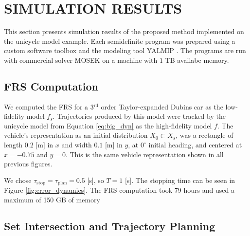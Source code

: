 \section{SIMULATION RESULTS}
\label{sec:examples}
This section presents simulation results of the proposed method implemented on the unicycle model example.
Each semidefinite program was prepared using a custom software toolbox and the modeling tool YALMIP \cite{lofberg2004yalmip}.
The programs are run with commercial solver MOSEK on a machine with $1$ TB availabe memory. 

\subsection{FRS Computation}
We computed the FRS for a 3$^\text{rd}$ order Taylor-expanded Dubins car as the low-fidelity model $f_s$.
Trajectories produced by this model were tracked by the unicycle model from Equation \eqref{eq:big_dyn} as the high-fidelity model $f$.
The vehicle's representation as an initial distribution $X_0 \subset X_s$, was a rectangle of length $0.2$ [m] in $x$ and width $0.1$ [m] in $y$, at $0^\circ$ initial heading, and centered at $x=-0.75$ and $y=0$.
This is the same vehicle representation shown in all previous figures.

We chose $\tau_\text{stop} = \tau_\text{plan} = 0.5$ [s], so $T = 1$ [s].
The stopping time can be seen in Figure \ref{fig:error_dynamics}. 
The FRS computation took 79 hours and used a maximum of 150 GB of memory 

\subsection{Set Intersection and Trajectory Planning}

